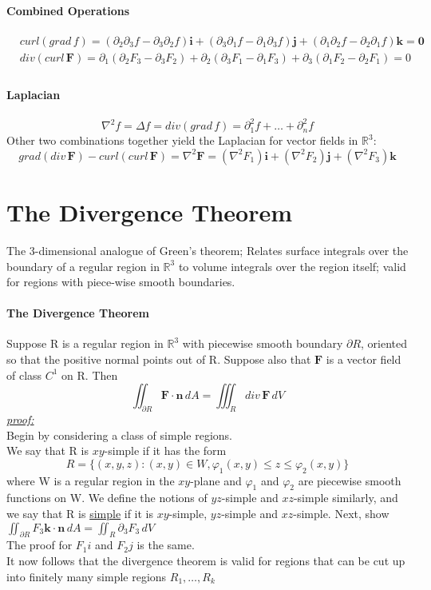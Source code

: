\documentclass[11pt]{article}
\newcommand{\tb}[1]{\textbf{#1}}
\newcommand{\real}[0]{\mathbb{R}}
\newcommand{\under}[1]{\underline{#1}}
\newcommand{\proof}[0]{\textit{\underline{proof:} }}
\newcommand{\vo}[0]{\tb{0}}
\newcommand{\vf}[0]{\tb{F}}
\newcommand{\vi}[0]{\tb{i}}
\newcommand{\vj}[0]{\tb{j}}
\newcommand{\vk}[0]{\tb{k}}
\newcommand{\p}[0]{\partial}
\begin{document}
\paragraph{Combined Operations}
\begin{align}
	&curl(grad\,f) = (\p_2\p_3f-\p_3\p_2f)\vi+(\p_3\p_1f-\p_1\p_3f)\vj+(\p_1\p_2f-\p_2\p_1f)\vk = \vo\\
	&div(curl\,\vf) = \p_1(\p_2F_3 - \p_3F_2)+\p_2(\p_3F_1-\p_1F_3)+\p_3(\p_1F_2-\p_2F_1) = 0\\
\end{align}
\paragraph{Laplacian}
$$\nabla^2f=\Delta f = div(grad\,f) = \p_1^2f + \hdots + \p_n^2f$$
Other two combinations together yield the Laplacian for vector fields in $\real^3$:
$$grad(div\,\vf)-curl(curl\,\vf) = \nabla^2\vf = (\nabla^2F_1)\vi + (\nabla^2F_2)\vj + (\nabla^2F_3)\vk$$
\section{The Divergence Theorem}
The 3-dimensional analogue of Green's theorem; Relates surface integrals over the boundary of a regular region in $\real^3$ to volume integrals over the region itself; valid for regions with piece-wise smooth boundaries.
\paragraph{The Divergence Theorem} Suppose R is a regular region in $\real^3$ with piecewise smooth boundary $\p R$, oriented so that the positive normal points out of R. Suppose also that $\vf$ is a vector field of class $C^1$ on R. Then
	$$\iint_{\p R}\vf\cdot\tb{n}\,dA = \iiint_R div\, \vf\,dV$$
\proof \\
Begin by considering a class of simple regions.\\
We say that R is $xy$-simple if it has the form
$$R = \{(x,y,z):(x,y)\in W,\varphi_1(x,y) \leq z \leq \varphi_2(x,y)\}$$
where W is a regular region in the $xy$-plane and  $\varphi_1$ and $\varphi_2$ are piecewise smooth functions on W. We define the notions of $yz$-simple and $xz$-simple similarly, and we say that R is \under{simple} if it is $xy$-simple, $yz$-simple and $xz$-simple.
Next, show $\iint_{\partial R}F_3\tb{k}\cdot\tb{n}\,dA = \iint_R \partial_3 F_3 \, dV$\\
The proof for $F_1i$ and $F_2 j$ is the same.\\
It now follows that the divergence theorem is valid for regions that can be cut up into finitely many simple regions $R_1, \hdots, R_k$
\end{document}
